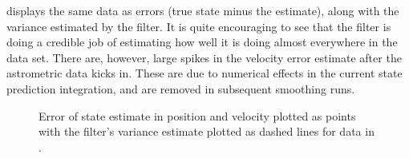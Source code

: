  displays the same data as errors (true state minus the estimate), along with the variance estimated by the filter.  It is quite encouraging to see that the filter is doing a credible job of estimating how well it is doing almost everywhere in the data set. There are, however, large spikes in  the velocity error estimate after the astrometric data kicks in.  These are due to numerical effects in the current state prediction integration, and are removed in subsequent smoothing runs.
\begin{figure}[ht]
 \begin{center}
 \end{center}
 \caption[Filter estimated error for Earth mass planet]{ \label{fig:true_mass_err}
	Error of state estimate in  position and velocity plotted as points with the filter's variance estimate plotted as dashed lines for data in .}
\end{figure}


